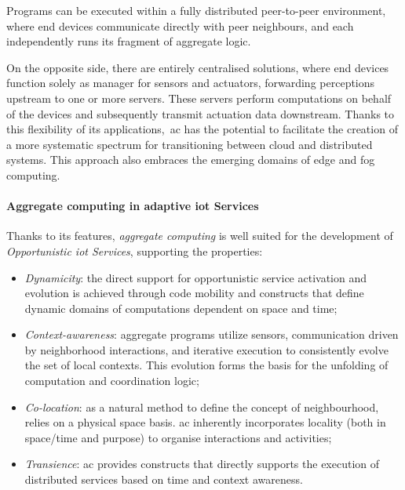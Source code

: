 Programs can be executed within a fully distributed peer-to-peer environment, where end devices communicate directly
with peer neighbours, and each independently runs its fragment of aggregate logic.

On the opposite side, there are entirely centralised solutions, where end devices function solely as manager for sensors
and actuators, forwarding perceptions upstream to one or more servers.
These servers perform computations on behalf of the devices and subsequently transmit actuation data downstream.
Thanks to this flexibility of its applications,~\ac{ac} has the potential to facilitate the creation of a more systematic
spectrum for transitioning between cloud and distributed systems.
This approach also embraces the emerging domains of edge and fog computing.

\paragraph{Aggregate computing in adaptive \ac{iot} Services}
Thanks to its features, \emph{aggregate computing} is well suited for the development of \emph{Opportunistic \ac{iot}
Services}, supporting the properties:
\begin{itemize}
    \item \emph{Dynamicity}: the direct support for opportunistic service activation and evolution is achieved through
        code mobility and constructs that define dynamic domains of computations dependent on space and time;
    \item \emph{Context-awareness}: aggregate programs utilize sensors, communication driven by neighborhood interactions,
        and iterative execution to consistently evolve the set of local contexts.
        This evolution forms the basis for the unfolding of computation and coordination logic;
    \item \emph{Co-location}: as a natural method to define the concept of neighbourhood, relies on a physical space basis.
        \ac{ac} inherently incorporates locality (both in space/time and purpose) to organise interactions and activities;
    \item \emph{Transience}: \ac{ac} provides constructs that directly supports the execution of distributed services
        based on time and context awareness.
\end{itemize}

